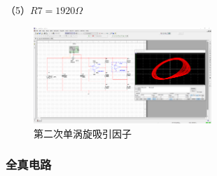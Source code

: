 \documentclass[10pt,a4paper,twoside,UTF8]{ctexart}
\begin{document}
（5）$R7=1920\Omega$
\begin{figure}[H]
	\centering
	\includegraphics[width=0.6\textwidth]{fig//fig.1.5.PNG}
	\caption{第二次单涡旋吸引因子}	
\end{figure}

\subsubsection{全真电路}
\end{document}
